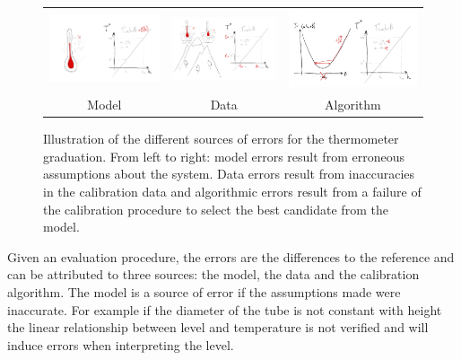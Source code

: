 \begin{bibunit}
\begin{figure}
\begin{tabular}{c|c|c}
     \hspace{-.15\linewidth}\includegraphics[width=.4\linewidth]{Introduction/pics/model_err_w_source.png}  &
     \includegraphics[width=.4\linewidth]{Introduction/pics/data_err_w_source.png} &
     \includegraphics[width=.4\linewidth]{Introduction/pics/optim_err_w_source.png} \\
     \hspace{-.15\linewidth}Model &  Data &  Algorithm \\
\end{tabular}
    \centering
    \caption{Illustration of the different sources of errors for the thermometer graduation. From left to right: model errors result from erroneous assumptions about the system. Data errors result from inaccuracies in the calibration data and algorithmic errors result from a failure of the calibration procedure to select the best candidate from the model.}
    \label{fig:err_sources}
\end{figure}
Given an evaluation procedure, the errors are the differences to the reference and can be attributed to three sources: the model, the data and the calibration algorithm.
 The model is a source of error if the assumptions made were inaccurate. For example if the diameter of the tube is not constant with height the linear relationship between level and temperature is not verified and will induce errors when interpreting the level.


\end{bibunit}
